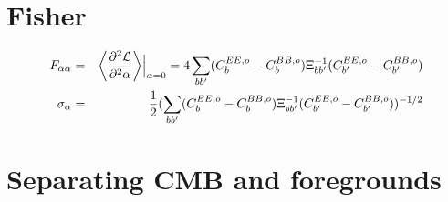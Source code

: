 \documentclass[a4paper, 11pt]{article}
\def\ba{\begin{eqnarray}}
\def\ea{\end{eqnarray}}
\begin{document}
\section{Fisher}
\ba
F_{\alpha \alpha} &=& \left \langle \frac{ \partial^{2} {\cal L} }{ \partial^{2}{\alpha} }\right \rangle \Bigr\rvert_{\alpha=0} = 4 \sum_{bb'}( C^{EE,o}_{b} - C^{BB,o}_{b} ) \Xi^{-1}_{bb'} ( C^{EE,o}_{b'} - C^{BB,o}_{b'} ) \\
\sigma_{\alpha} &=& \frac{1}{2} ( \sum_{bb'}( C^{EE,o}_{b} - C^{BB,o}_{b} ) \Xi^{-1}_{bb'} ( C^{EE,o}_{b'} - C^{BB,o}_{b'} ))^{-1/2}
\ea

\section{Separating CMB and foregrounds}
\end{document}
